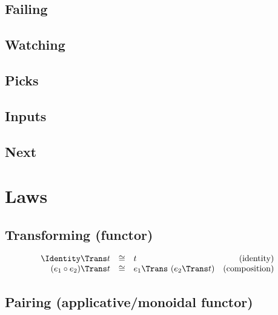 

\subsection{Failing}



\subsection{Watching}



\subsection{Picks}



\subsection{Inputs}




\subsection{Next}



\section{Laws}

\subsection{Transforming (functor)}

\begin{equation*}
  \begin{array}{rclr}
    \Identity \Trans t
      &\cong& t
      & \text{(identity)} \\
    (e_1 \circ e_2) \Trans t
      &\cong& e_1 \Trans\ (e_2 \Trans t)
      & \text{(composition)} \\
  \end{array}
\end{equation*}


\subsection{Pairing (applicative/monoidal functor)}

